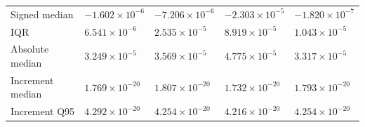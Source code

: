 \begin{tabular}{lllll}
Signed median & $-1.602\times10^{-6}$ & $-7.206\times10^{-6}$ & $-2.303\times10^{-5}$ & $-1.820\times10^{-7}$ \\
IQR & $6.541\times10^{-6}$ & $2.535\times10^{-5}$ & $8.919\times10^{-5}$ & $1.043\times10^{-5}$ \\
Absolute median & $3.249\times10^{-5}$ & $3.569\times10^{-5}$ & $4.775\times10^{-5}$ & $3.317\times10^{-5}$ \\
Increment median & $1.769\times10^{-20}$ & $1.807\times10^{-20}$ & $1.732\times10^{-20}$ & $1.793\times10^{-20}$ \\
Increment Q95 & $4.292\times10^{-20}$ & $4.254\times10^{-20}$ & $4.216\times10^{-20}$ & $4.254\times10^{-20}$ \\
\end{tabular}
